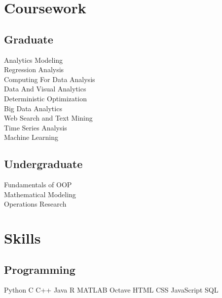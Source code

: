 \documentclass[]{deedy-resume-openfont}
\begin{document}
\begin{minipage}[t]{0.31\textwidth}

\section{Coursework}
\subsection{Graduate}
Analytics Modeling \\ 
Regression Analysis \\
Computing For Data Analysis \\
Data And Visual Analytics \\
Deterministic Optimization \\
Big Data Analytics \\
Web Search and Text Mining \\
Time Series Analysis \\
Machine Learning \\
\sectionsep

\subsection{Undergraduate}
Fundamentals of OOP \\
Mathematical Modeling \\
Operations Research
\sectionsep



\section{Skills}
\subsection{Programming}
\textbullet{} Python \textbullet{} C \textbullet{} C++ \textbullet{} Java \textbullet{} R \textbullet{} MATLAB \textbullet{} Octave \textbullet{} HTML \textbullet{} CSS \textbullet{} JavaScript \textbullet{} SQL 
\sectionsep


\end{minipage}
\end{document}
